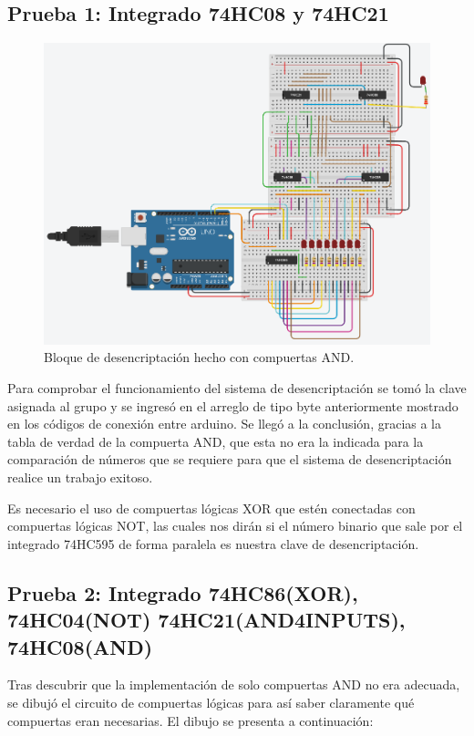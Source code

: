 \documentclass{article}
\begin{document}
\newpage
\subsection{Prueba 1: Integrado 74HC08 y 74HC21}

\begin{figure}[h]
\includegraphics[scale=0.6]{74HC08.png}
\centering
\caption{Bloque de desencriptación hecho con compuertas AND.}
\label{fig:74HC08}
\end{figure}

Para comprobar el funcionamiento del sistema de desencriptación se tomó la clave asignada al grupo y se ingresó en el arreglo de tipo byte anteriormente mostrado en los códigos de conexión entre arduino. 
Se llegó a la conclusión, gracias a la tabla de verdad de la compuerta AND, que esta no era la indicada para la comparación de números que se requiere para que el sistema de desencriptación realice un trabajo exitoso.

Es necesario el uso de compuertas lógicas XOR que estén conectadas con compuertas lógicas NOT, las cuales nos dirán si el número binario que sale por el integrado 74HC595 de forma paralela es nuestra clave de desencriptación.

\newpage
\subsection{Prueba 2: Integrado 74HC86(XOR), 74HC04(NOT) 74HC21(AND4INPUTS), 74HC08(AND)}
Tras descubrir que la implementación de solo compuertas AND no era adecuada, se dibujó el circuito de compuertas lógicas para así saber claramente qué compuertas eran necesarias. El dibujo se presenta a continuación:
\end{document}
